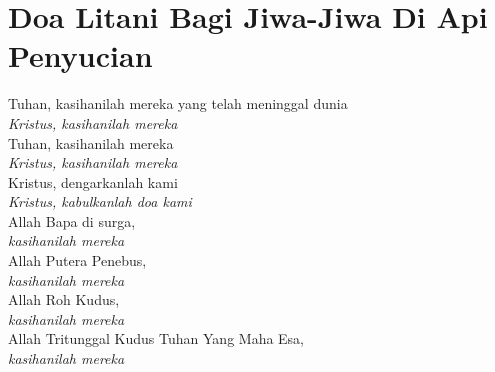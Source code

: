 \documentclass[12pt,a4paper]{article}
\begin{document}
\setlength{\parindent}{0mm}
\section*{
Doa Litani 
Bagi Jiwa-Jiwa Di Api Penyucian}

Tuhan, kasihanilah mereka
yang telah meninggal dunia\\
\textit{\hspace*{5mm}Kristus, kasihanilah mereka}\\
Tuhan, kasihanilah mereka\\
\textit{\hspace*{5mm}Kristus, kasihanilah mereka}\\
Kristus, dengarkanlah kami\\
\textit{\hspace*{5mm}Kristus, kabulkanlah doa kami}\\

Allah Bapa di surga, \\
\textit{\hspace*{5mm}kasihanilah mereka}\\
Allah Putera Penebus, \\
\textit{\hspace*{5mm}kasihanilah mereka}\\
Allah Roh Kudus, \\
\textit{\hspace*{5mm}kasihanilah mereka}\\
Allah Tritunggal Kudus Tuhan Yang Maha Esa,\\ \textit{\hspace*{5mm}kasihanilah mereka}\\
\end{document}
